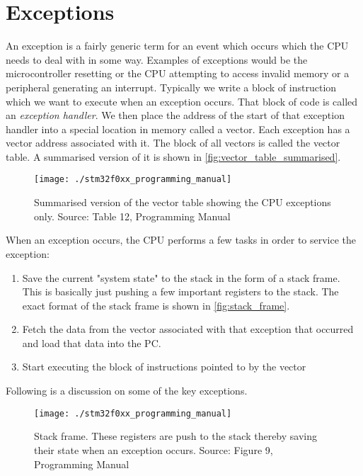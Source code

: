 \chapter{Exceptions}
\label{sec:exceptions}
An exception is a fairly generic term for an event which occurs which the CPU needs to deal with in some way. Examples of exceptions would be the microcontroller resetting or the CPU attempting to access invalid memory or a peripheral generating an interrupt. Typically we write a block of instruction which we want to execute when an exception occurs. That block of code is called an \emph{exception handler}. We then place the address of the start of that exception handler into a special location in memory called a vector. Each exception has a vector address associated with it. The block of all vectors is called the vector table. A summarised version of it is shown in \autoref{fig:vector_table_summarised}.

\begin{figure}
\centering
\texttt{[image: ./stm32f0xx\_programming\_manual]}
\caption{Summarised version of the vector table showing the CPU exceptions only. Source: Table 12, Programming Manual}
\label{fig:vector_table_summarised}
\end{figure}

When an exception occurs, the CPU performs a few tasks in order to service the exception:
\begin{enumerate}
    \item Save the current "system state" to the stack in the form of a stack frame. This is basically just pushing a few important registers to the stack. The exact format of the stack frame is shown in \autoref{fig:stack_frame}.
    \item Fetch the data from the vector associated with that exception that occurred and load that data into the PC.
    \item Start executing the block of instructions pointed to by the vector
\end{enumerate}

Following is a discussion on some of the key exceptions.

\begin{figure}
\centering
\texttt{[image: ./stm32f0xx\_programming\_manual]}
\caption{Stack frame. These registers are push to the stack thereby saving their state when an exception occurs. Source: Figure 9, Programming Manual}
\label{fig:stack_frame}
\end{figure}

